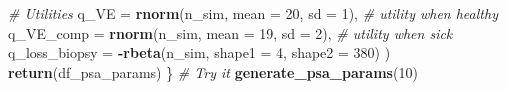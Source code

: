 \documentclass[
]{article}
\newenvironment{Shaded}{\begin{snugshade}}{\end{snugshade}}
\newcommand{\CommentTok}[1]{\textcolor[rgb]{0.56,0.35,0.01}{\textit{#1}}}
\newcommand{\DataTypeTok}[1]{\textcolor[rgb]{0.13,0.29,0.53}{#1}}
\newcommand{\DecValTok}[1]{\textcolor[rgb]{0.00,0.00,0.81}{#1}}
\newcommand{\KeywordTok}[1]{\textcolor[rgb]{0.13,0.29,0.53}{\textbf{#1}}}
\newcommand{\NormalTok}[1]{#1}
\newcommand{\OperatorTok}[1]{\textcolor[rgb]{0.81,0.36,0.00}{\textbf{#1}}}
\begin{document}
\begin{Shaded}
\begin{Highlighting}[]
    \CommentTok{# Utilities}
    \DataTypeTok{q_VE          =} \KeywordTok{rnorm}\NormalTok{(n_sim, }\DataTypeTok{mean =} \DecValTok{20}\NormalTok{, }\DataTypeTok{sd =} \DecValTok{1}\NormalTok{), }\CommentTok{# utility when healthy}
    \DataTypeTok{q_VE_comp     =} \KeywordTok{rnorm}\NormalTok{(n_sim, }\DataTypeTok{mean =} \DecValTok{19}\NormalTok{, }\DataTypeTok{sd =} \DecValTok{2}\NormalTok{), }\CommentTok{# utility when sick}
    \DataTypeTok{q_loss_biopsy =} \OperatorTok{-}\KeywordTok{rbeta}\NormalTok{(n_sim, }\DataTypeTok{shape1 =} \DecValTok{4}\NormalTok{, }\DataTypeTok{shape2 =} \DecValTok{380}\NormalTok{)}
\NormalTok{  )}
  \KeywordTok{return}\NormalTok{(df_psa_params)}
\NormalTok{\}}
\CommentTok{# Try it}
\KeywordTok{generate_psa_params}\NormalTok{(}\DecValTok{10}\NormalTok{) }
\end{Highlighting}
\end{Shaded}
\end{document}
